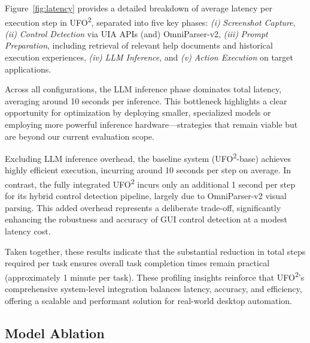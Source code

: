 \documentclass[sigplan,10pt]{acmart}
\newcommand{\name}{\textsc{UFO}\textsuperscript{2}\xspace}
\begin{document}
Figure~\ref{fig:latency} provides a detailed breakdown of average latency per execution step in \name, separated into five key phases:
\textit{(i)} \emph{Screenshot Capture},  
\textit{(ii)} \emph{Control Detection} via UIA APIs (and) OmniParser-v2,  
\textit{(iii)} \emph{Prompt Preparation}, including retrieval of relevant help documents and historical execution experiences,  
\textit{(iv)} \emph{LLM Inference}, and  
\textit{(v)} \emph{Action Execution} on target applications.

Across all configurations, the LLM inference phase dominates total latency, averaging around 10 seconds per inference. This bottleneck highlights a clear opportunity for optimization by deploying smaller, specialized models or employing more powerful inference hardware—strategies that remain viable but are beyond our current evaluation scope.

Excluding LLM inference overhead, the baseline system (\name-base) achieves highly efficient execution, incurring around 10 seconds per step on average. In contrast, the fully integrated \name incurs only an additional 1 second per step for its hybrid control detection pipeline, largely due to OmniParser-v2 visual parsing. This added overhead represents a deliberate trade-off, significantly enhancing the robustness and accuracy of GUI control detection at a modest latency cost.

Taken together, these results indicate that the substantial reduction in total steps required per task ensures overall task completion times remain practical (approximately 1 minute per task). These profiling insights reinforce that \name's comprehensive system-level integration balances latency, accuracy, and efficiency, offering a scalable and performant solution for real-world desktop automation.


\subsection{Model Ablation}

\end{document}
